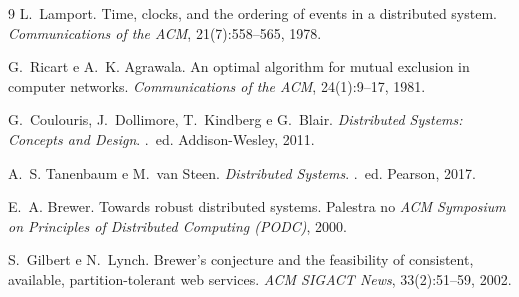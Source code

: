 \documentclass[11pt,a4paper]{article}
\begin{document}
\begin{thebibliography}{9}
L.~Lamport.
\newblock Time, clocks, and the ordering of events in a distributed system.
\newblock \emph{Communications of the ACM}, 21(7):558--565, 1978.

G.~Ricart e A.~K. Agrawala.
\newblock An optimal algorithm for mutual exclusion in computer networks.
\newblock \emph{Communications of the ACM}, 24(1):9--17, 1981.

G.~Coulouris, J.~Dollimore, T.~Kindberg e G.~Blair.
\newblock \emph{Distributed Systems: Concepts and Design}.
.~ed. Addison-Wesley, 2011.

A.~S. Tanenbaum e M.~van Steen.
\newblock \emph{Distributed Systems}.
.~ed. Pearson, 2017.

E.~A. Brewer.
\newblock Towards robust distributed systems.
\newblock Palestra no \emph{ACM Symposium on Principles of Distributed Computing
  (PODC)}, 2000.

S.~Gilbert e N.~Lynch.
\newblock Brewer's conjecture and the feasibility of consistent, available,
  partition-tolerant web services.
\newblock \emph{ACM SIGACT News}, 33(2):51--59, 2002.
\end{thebibliography}
\end{document}
